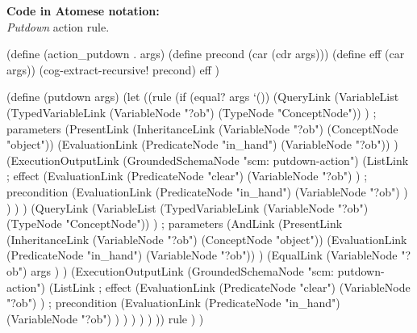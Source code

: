 \begin{footnotesize}
\textbf{Code in Atomese notation:} \\
\textit{Putdown} action rule.
\end{footnotesize}

\begin{python}
(define (action_putdown . args)
  (define precond (car (cdr args)))
  (define eff (car args))
  (cog-extract-recursive! precond)
  eff
)

(define (putdown args)
  (let
    ((rule
      (if (equal? args `())
        (QueryLink
          (VariableList
            (TypedVariableLink
              (VariableNode "?ob") 
              (TypeNode "ConceptNode"))
          ) ; parameters
          (PresentLink
            (InheritanceLink
              (VariableNode "?ob")
              (ConceptNode "object"))
            (EvaluationLink
              (PredicateNode "in_hand")
              (VariableNode "?ob"))
          )
          (ExecutionOutputLink
            (GroundedSchemaNode "scm: putdown-action")
            (ListLink
              ; effect
              (EvaluationLink
                (PredicateNode "clear")
                (VariableNode "?ob")
              )
              ; precondition
              (EvaluationLink
                (PredicateNode "in_hand")
                (VariableNode "?ob")
              )
            )
          )
        )
        (QueryLink
          (VariableList
            (TypedVariableLink
              (VariableNode "?ob") 
              (TypeNode "ConceptNode"))
          ) ; parameters
          (AndLink
            (PresentLink
              (InheritanceLink
                (VariableNode "?ob")
                (ConceptNode "object"))
              (EvaluationLink
                (PredicateNode "in_hand")
                (VariableNode "?ob"))
            )
            (EqualLink
              (VariableNode "?ob")
              args
            )
          )
          (ExecutionOutputLink
            (GroundedSchemaNode "scm: putdown-action")
            (ListLink
              ; effect
              (EvaluationLink
                (PredicateNode "clear")
                (VariableNode "?ob")
              )
              ; precondition
              (EvaluationLink
                (PredicateNode "in_hand")
                (VariableNode "?ob")
              )
            )
          )
        )
      )
    ))
    rule
  )
)
\end{python}

\bigskip

